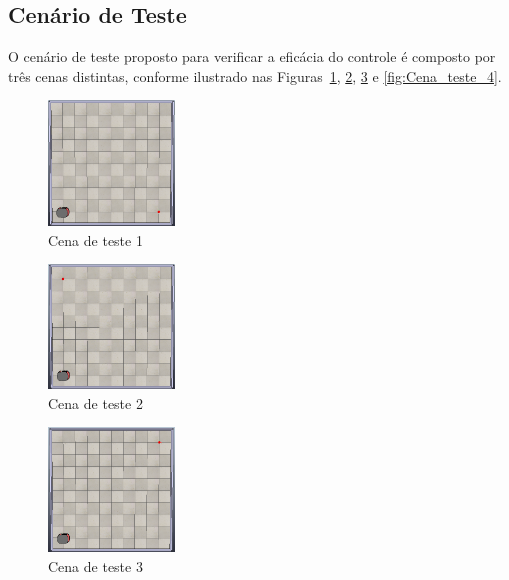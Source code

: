 \documentclass[conference]{IEEEtran}
\begin{document}
\subsection{Cenário de Teste}

O cenário de teste proposto para verificar a eficácia do controle é composto por três cenas distintas, conforme ilustrado nas Figuras~\ref{fig:Cena_teste_1}, \ref{fig:Cena_teste_2},  \ref{fig:Cena_teste_3} e  \ref{fig:Cena_teste_4}.

\begin{figure}[h!]
    \centering
    \includegraphics[width=0.3\textwidth]{Figuras/Cena_teste_1.png}
    \caption{Cena de teste 1}
    \label{fig:Cena_teste_1}
\end{figure}

\begin{figure}[h!]
    \centering
    \includegraphics[width=0.3\textwidth]{Figuras/Cena_teste_2.png}
    \caption{Cena de teste 2}
    \label{fig:Cena_teste_2}
\end{figure}

\begin{figure}[h!]
    \centering
    \includegraphics[width=0.3\textwidth]{Figuras/Cena_teste_3.png}
    \caption{Cena de teste 3}
    \label{fig:Cena_teste_3}
\end{figure}
\end{document}
